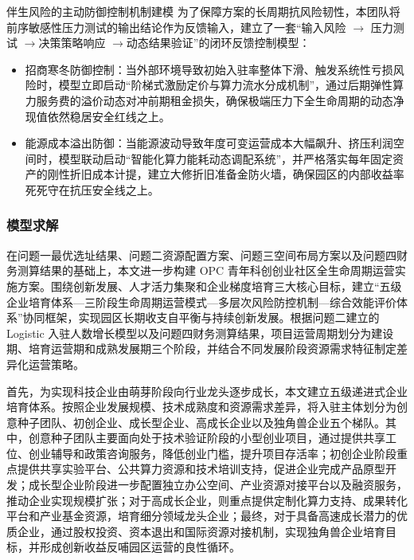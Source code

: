 \documentclass[12pt,a4paper]{article}
\begin{document}
伴生风险的主动防御控制机制建模
为了保障方案的长周期抗风险韧性，本团队将前序敏感性压力测试的输出结论作为反馈输入，建立了一套“输入风险 $\rightarrow$ 压力测试 $\rightarrow $决策策略响应 $\rightarrow $动态结果验证”的闭环反馈控制模型：
\begin{itemize}
\item 招商寒冬防御控制：当外部环境导致初始入驻率整体下滑、触发系统性亏损风险时，模型立即启动“阶梯式激励定价与算力流水分成机制”，通过后期弹性算力服务费的溢价动态对冲前期租金损失，确保极端压力下全生命周期的动态净现值依然稳居安全红线之上。
\item 能源成本溢出防御：当能源波动导致年度可变运营成本大幅飙升、挤压利润空间时，模型联动启动“智能化算力能耗动态调配系统”，并严格落实每年固定资产的刚性折旧成本计提，建立大修折旧准备金防火墙，确保园区的内部收益率死死守在抗压安全线之上。
\end{itemize}

\subsubsection{模型求解}

在问题一最优选址结果、问题二资源配置方案、问题三空间布局方案以及问题四财务测算结果的基础上，本文进一步构建 OPC 青年科创创业社区全生命周期运营实施方案。围绕创新发展、人才活力集聚和企业梯度培育三大核心目标，建立“五级企业培育体系—三阶段生命周期运营模式—多层次风险防控机制—综合效能评价体系”协同框架，实现园区长期收支自平衡与持续创新发展。根据问题二建立的 Logistic 入驻人数增长模型以及问题四财务测算结果，项目运营周期划分为建设期、培育运营期和成熟发展期三个阶段，并结合不同发展阶段资源需求特征制定差异化运营策略。

首先，为实现科技企业由萌芽阶段向行业龙头逐步成长，本文建立五级递进式企业培育体系。按照企业发展规模、技术成熟度和资源需求差异，将入驻主体划分为创意种子团队、初创企业、成长型企业、高成长企业以及独角兽企业五个梯队。其中，创意种子团队主要面向处于技术验证阶段的小型创业项目，通过提供共享工位、创业辅导和政策咨询服务，降低创业门槛，提升项目存活率；初创企业阶段重点提供共享实验平台、公共算力资源和技术培训支持，促进企业完成产品原型开发；成长型企业阶段进一步配置独立办公空间、产业资源对接平台以及融资服务，推动企业实现规模扩张；对于高成长企业，则重点提供定制化算力支持、成果转化平台和产业基金资源，培育细分领域龙头企业；最终，对于具备高速成长潜力的优质企业，通过股权投资、资本退出和国际资源对接机制，实现独角兽企业培育目标，并形成创新收益反哺园区运营的良性循环。
\end{document}
